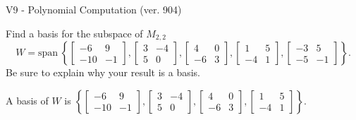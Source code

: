 \begin{exercise}
  \begin{exerciseTitle}V9 - Polynomial Computation (ver. 904)\end{exerciseTitle}
  \begin{exerciseStatement}
    Find a basis for the subspace of \(M_{2,2}\) 
\[W=\mathrm{span}\ \left\{\left[\begin{array}{cc}
-6 & 9 \\
-10 & -1
\end{array}\right] , \left[\begin{array}{cc}
3 & -4 \\
5 & 0
\end{array}\right] , \left[\begin{array}{cc}
4 & 0 \\
-6 & 3
\end{array}\right] , \left[\begin{array}{cc}
1 & 5 \\
-4 & 1
\end{array}\right] , \left[\begin{array}{cc}
-3 & 5 \\
-5 & -1
\end{array}\right]\right\}.\]
 Be sure to explain why your result is a basis.


  \end{exerciseStatement}
  \begin{exerciseAnswer}
   A basis of \(W\) is  \(\left\{\left[\begin{array}{cc}
-6 & 9 \\
-10 & -1
\end{array}\right] , \left[\begin{array}{cc}
3 & -4 \\
5 & 0
\end{array}\right] , \left[\begin{array}{cc}
4 & 0 \\
-6 & 3
\end{array}\right] , \left[\begin{array}{cc}
1 & 5 \\
-4 & 1
\end{array}\right]\right\}\).
  


  \end{exerciseAnswer}
\end{exercise}